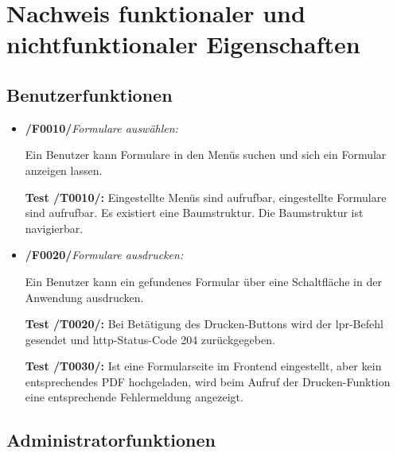 \section{Nachweis funktionaler und nichtfunktionaler Eigenschaften}


\subsection{Benutzerfunktionen}

\begin{itemize}
    \item \textbf{/F0010/}\textit{Formulare auswählen:} \par
    Ein Benutzer kann Formulare in den Menüs suchen und sich ein Formular anzeigen lassen.\par
    \noindent \textbf{Test /T0010/:} Eingestellte Menüs sind aufrufbar, eingestellte Formulare sind aufrufbar. Es existiert eine Baumstruktur. Die Baumstruktur ist navigierbar.
    
    \item \textbf{/F0020/}\textit{Formulare ausdrucken:} \par
    Ein Benutzer kann ein gefundenes Formular über eine Schaltfläche in der Anwendung ausdrucken.\par
    \noindent \textbf{Test /T0020/:} Bei Betätigung des Drucken-Buttons wird der lpr-Befehl gesendet und http-Status-Code 204 zurückgegeben.\par
    \noindent \textbf{Test /T0030/:} Ist eine Formularseite im Frontend eingestellt, aber kein entsprechendes PDF hochgeladen, wird beim Aufruf der Drucken-Funktion eine entsprechende Fehlermeldung angezeigt.
\end{itemize}

\vspace{1,5cm}

\subsection{Administratorfunktionen}

